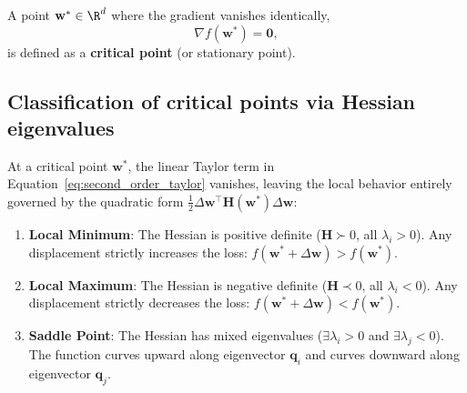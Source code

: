 A point $\mathbf{w}^* \in \R^d$ where the gradient vanishes identically,
\begin{equation}
\nabla f(\mathbf{w}^*) = \mathbf{0},
\label{eq:stationary_point}
\end{equation}
is defined as a \textbf{critical point} (or stationary point).

\subsection{Classification of critical points via Hessian eigenvalues}
\label{sec:hessian_classification}

At a critical point $\mathbf{w}^*$, the linear Taylor term in Equation~\eqref{eq:second_order_taylor} vanishes, leaving the local behavior entirely governed by the quadratic form $\frac{1}{2} \Delta \mathbf{w}^\top \mathbf{H}(\mathbf{w}^*) \Delta \mathbf{w}$:
\begin{enumerate}
  \item \textbf{Local Minimum}: The Hessian is positive definite ($\mathbf{H} \succ 0$, all $\lambda_i > 0$). Any displacement strictly increases the loss: $f(\mathbf{w}^* + \Delta \mathbf{w}) > f(\mathbf{w}^*)$.
  \item \textbf{Local Maximum}: The Hessian is negative definite ($\mathbf{H} \prec 0$, all $\lambda_i < 0$). Any displacement strictly decreases the loss: $f(\mathbf{w}^* + \Delta \mathbf{w}) < f(\mathbf{w}^*)$.
  \item \textbf{Saddle Point}: The Hessian has mixed eigenvalues ($\exists \lambda_i > 0$ and $\exists \lambda_j < 0$). The function curves upward along eigenvector $\mathbf{q}_i$ and curves downward along eigenvector $\mathbf{q}_j$.
\end{enumerate}

